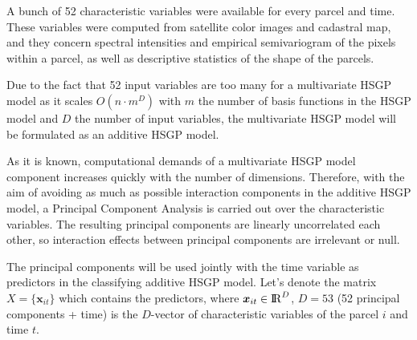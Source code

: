 \documentclass[]{interact}
\theoremstyle{plain}%
\theoremstyle{definition}
\theoremstyle{remark}
\begin{document}
A bunch of 52 characteristic variables were available for every parcel and time. These variables were computed from satellite color images and cadastral map, and they concern spectral intensities and empirical semivariogram of the pixels within a parcel, as well as descriptive statistics of the shape of the parcels.



Due to the fact that 52 input variables are too many for a multivariate HSGP model as it scales $O(n\cdot m^D)$ with $m$ the number of basis functions in the HSGP model and $D$ the number of input variables, the multivariate HSGP model will be formulated as an additive HSGP model. %

As it is known, computational demands of a multivariate HSGP model component increases quickly with the number of dimensions. Therefore, with the aim of avoiding as much as possible interaction components in the additive HSGP model, a Principal Component Analysis is carried out over the characteristic variables. The resulting principal components are linearly uncorrelated each other, so interaction effects between principal components are irrelevant or null. 

The principal components will be used jointly with the time variable as predictors in the classifying additive HSGP model. Let's denote the matrix $X=\{\bm{x}_{it}\}$ which contains the predictors, where $\bm{x}_{it} \in {\rm I\!R}^{D}$, $D=53$ (52 principal components + time) is the $D$-vector of characteristic variables of the parcel $i$ and time $t$. 
\end{document}
